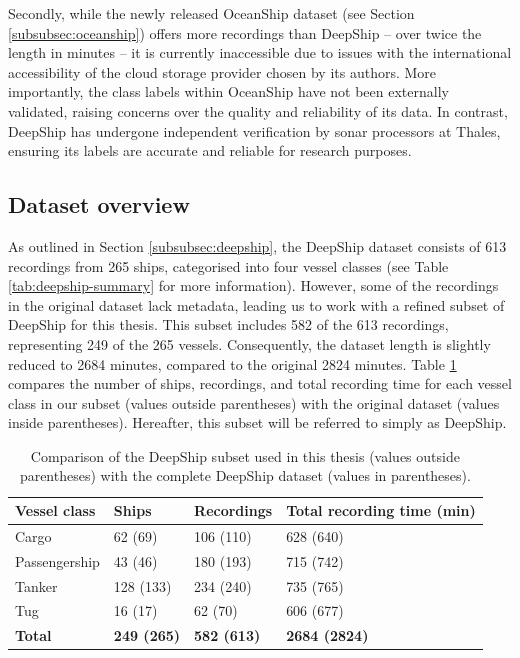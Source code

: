 Secondly, while the newly released OceanShip dataset (see Section \ref{subsubsec:oceanship}) offers more recordings than DeepShip -- over twice the length in minutes -- it is currently inaccessible due to issues with the international accessibility of the cloud storage provider chosen by its authors. More importantly, the class labels within OceanShip have not been externally validated, raising concerns over the quality and reliability of its data. In contrast, DeepShip has undergone independent verification by sonar processors at Thales, ensuring its labels are accurate and reliable for research purposes.

\subsection{Dataset overview}

As outlined in Section \ref{subsubsec:deepship}, the DeepShip dataset consists of 613 recordings from 265 ships, categorised into four vessel classes (see Table \ref{tab:deepship-summary} for more information). However, some of the recordings in the original dataset lack metadata, leading us to work with a refined subset of DeepShip for this thesis. This subset includes 582 of the 613 recordings, representing 249 of the 265 vessels. Consequently, the dataset length is slightly reduced to 2684 minutes, compared to the original 2824 minutes. Table \ref{tab:deepship-subset} compares the number of ships, recordings, and total recording time for each vessel class in our subset (values outside parentheses) with the original dataset (values inside parentheses). Hereafter, this subset will be referred to simply as DeepShip.

\begin{table}[htb]
\centering
\caption{Comparison of the DeepShip subset used in this thesis (values outside parentheses) with the complete DeepShip dataset (values in parentheses).}
\label{tab:deepship-subset}
\begin{tabular}{llll}
\toprule
\textbf{Vessel class} & \textbf{Ships} & \textbf{Recordings} & \textbf{Total recording time (min)} \\ \midrule
Cargo & 62 (69) & 106 (110) & 628 (640) \\
Passengership & 43 (46) & 180 (193) & 715 (742) \\
Tanker & 128 (133) & 234 (240) & 735 (765) \\
Tug & 16 (17) & 62 (70) & 606 (677) \\
\textbf{Total} & \textbf{249 (265)} & \textbf{582 (613)} & \textbf{2684 (2824)} \\ \bottomrule
\end{tabular}
\end{table}

